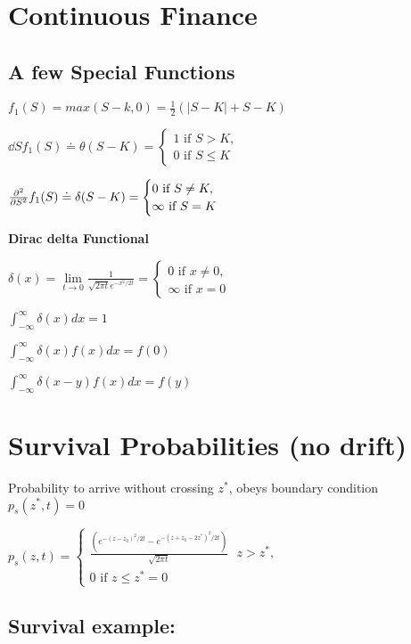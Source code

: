 \section{Continuous Finance}

\subsection{A few Special Functions}

$f_1(S) = max(S-k, 0) = \frac{1}{2}(|S-K| + S - K)$

$\dd{}{S}f_1(S) \doteq \theta(S-K) = \begin{cases} 1 \text{ if } S>K, \\ 0 \text{ if } S\leq K\end{cases}$

$\frac{\partial^{2} }{\partial S^{2}}f_1(S) \doteq \delta(S-K) = \begin{cases} 0 \text{ if } S\neq K, \\ \infty \text{ if } S = K\end{cases}$

\textbf{Dirac delta Functional}

$\delta(x) = \lim \limits_{t\to 0} \frac{1}{\sqrt{2\pi t}e^{-x^2/2t}} = \begin{cases} 0 \text{ if } x\neq 0, \\ \infty \text{ if } x = 0\end{cases}$

$\int_{-\infty}^{\infty}\delta(x)dx = 1$

$\int_{-\infty}^{\infty}\delta(x)f(x)dx = f(0)$

$\int_{-\infty}^{\infty}\delta(x-y)f(x)dx = f(y)$

\section{Survival Probabilities (no drift)}
Probability to arrive without crossing $z^*$, obeys boundary condition $p_s(z^*,t)=0$

$p_s(z,t) = \begin{cases} 
    \frac{(e^{-(z-z_0)^2/2t} - e^{-(z+z_0-2z^*)^2/2t})}{\sqrt{2\pi t}} \text{ } z > z^*, \\ 
    0 \text{ if } z \leq z^* = 0
\end{cases}$

\subsection{Survival example:}

